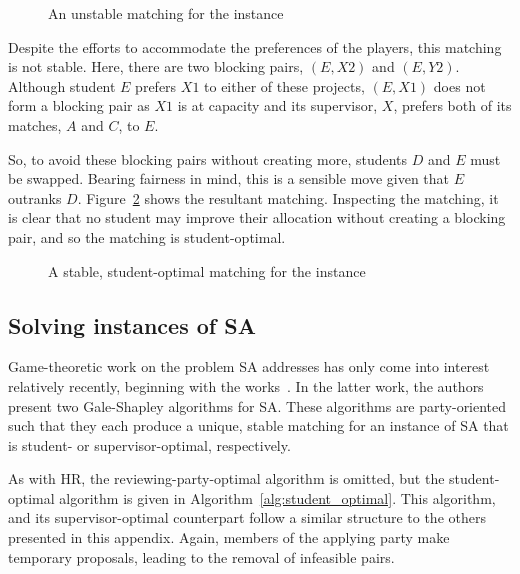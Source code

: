 \begin{figure}[htbp]
    \centering
    \resizebox{\imgwidth}{!}{%
        
    }\caption{An unstable matching for the instance}\label{fig:sa_unstable}
\end{figure}

Despite the efforts to accommodate the preferences of the players, this matching
is not stable. Here, there are two blocking pairs, \((E, X2)\) and \((E, Y2)\).
Although student \(E\) prefers \(X1\) to either of these projects, \((E, X1)\)
does not form a blocking pair as \(X1\) is at capacity and its supervisor,
\(X\), prefers both of its matches, \(A\) and \(C\), to \(E\).

So, to avoid these blocking pairs without creating more, students \(D\) and
\(E\) must be swapped. Bearing fairness in mind, this is a sensible move given
that \(E\) outranks \(D\). Figure~\ref{fig:sa_stable} shows the resultant
matching. Inspecting the matching, it is clear that no student may improve their
allocation without creating a blocking pair, and so the matching is
student-optimal.

\begin{figure}
    \centering
    \resizebox{\imgwidth}{!}{%
        
    }\caption{%
        A stable, student-optimal matching for the instance
    }\label{fig:sa_stable}
\end{figure}

\subsection{Solving instances of SA}

Game-theoretic work on the problem SA addresses has only come into interest
relatively recently, beginning with the works~\cite{Abraham2003,Abraham2007}. In
the latter work, the authors present two Gale-Shapley algorithms for SA. These
algorithms are party-oriented such that they each produce a unique, stable
matching for an instance of SA that is student- or supervisor-optimal,
respectively.

As with HR, the reviewing-party-optimal algorithm is omitted, but
the student-optimal algorithm is given in Algorithm~\ref{alg:student_optimal}.
This algorithm, and its supervisor-optimal counterpart follow a similar
structure to the others presented in this appendix. Again, members of the
applying party make temporary proposals, leading to the removal of infeasible
pairs.

